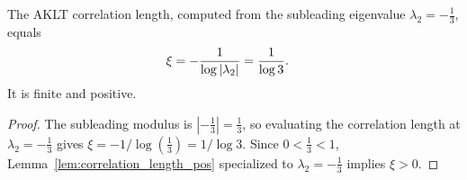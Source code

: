 \begin{lemma}\label{thm:aklt_correlation_length}
    \leanok
    The AKLT correlation length, computed from the subleading eigenvalue
    $\lambda_2 = -\tfrac13$, equals
    \begin{align}
        \xi
         & = -\frac{1}{\log|\lambda_2|}
        = \frac{1}{\log 3}.
        \notag
    \end{align}
    It is finite and positive.
\end{lemma}

\begin{proof}
    \leanok
    The subleading modulus is $|{-\tfrac13}| = \tfrac13$, so evaluating the
    correlation length at $\lambda_2 = -\tfrac13$ gives
    $\xi = -1/\log(\tfrac13) = 1/\log 3$. Since $0 < \tfrac13 < 1$,
    Lemma~\ref{lem:correlation_length_pos} specialized to $\lambda_2 = -\tfrac13$
    implies $\xi > 0$.
\end{proof}

